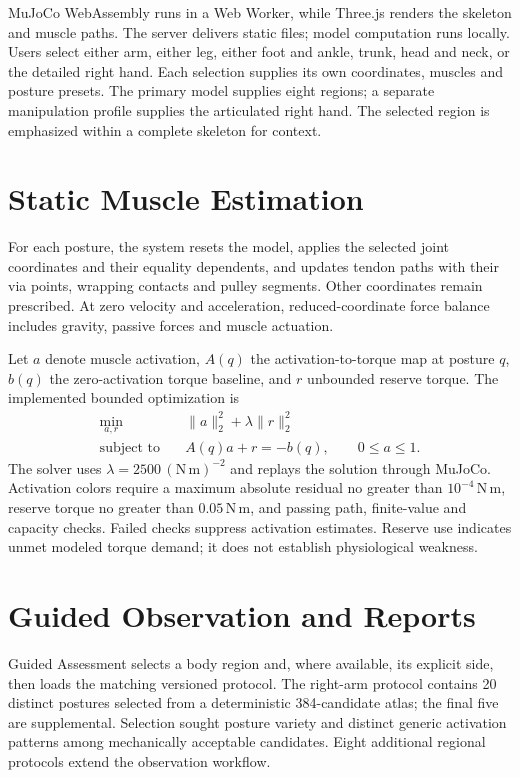 MuJoCo WebAssembly runs in a Web Worker, while Three.js renders the skeleton
and muscle paths. The server delivers static files; model computation runs
locally. Users select either arm, either leg, either foot and ankle, trunk,
head and neck, or the detailed right hand. Each selection supplies its own
coordinates, muscles and posture presets. The primary model supplies eight
regions; a separate manipulation profile supplies the articulated right hand.
The selected region is emphasized within a complete skeleton for context.

\section{Static Muscle Estimation}
For each posture, the system resets the model, applies the selected joint
coordinates and their equality dependents, and updates tendon paths with
their via points, wrapping contacts and pulley segments. Other coordinates
remain prescribed. At zero velocity and acceleration, reduced-coordinate
force balance includes gravity, passive forces and muscle actuation.

Let \(a\) denote muscle activation, \(A(q)\) the activation-to-torque map at
posture \(q\), \(b(q)\) the zero-activation torque baseline, and \(r\) unbounded reserve
torque. The implemented bounded optimization is
\begin{equation*}
\begin{aligned}
\min_{a,r}\quad & \lVert a\rVert_2^2+\lambda\lVert r\rVert_2^2\\
\text{subject to}\quad & A(q)a+r=-b(q),\qquad 0\leq a\leq1.
\end{aligned}
\end{equation*}
The solver uses \(\lambda=2500\,(\mathrm{N\,m})^{-2}\) and replays the
solution through MuJoCo. Activation colors require a maximum absolute residual
no greater than \(10^{-4}\,\mathrm{N\,m}\), reserve torque no greater than
\(0.05\,\mathrm{N\,m}\), and passing path, finite-value and capacity checks.
Failed checks suppress activation estimates. Reserve use indicates unmet
modeled torque demand; it does not establish physiological weakness.

\section{Guided Observation and Reports}
Guided Assessment selects a body region and, where available, its explicit
side, then loads the matching versioned protocol. The right-arm protocol
contains 20 distinct postures selected from a deterministic 384-candidate
atlas; the final five are supplemental. Selection sought posture variety and
distinct generic activation patterns among mechanically acceptable candidates.
Eight additional regional protocols extend the observation workflow.

